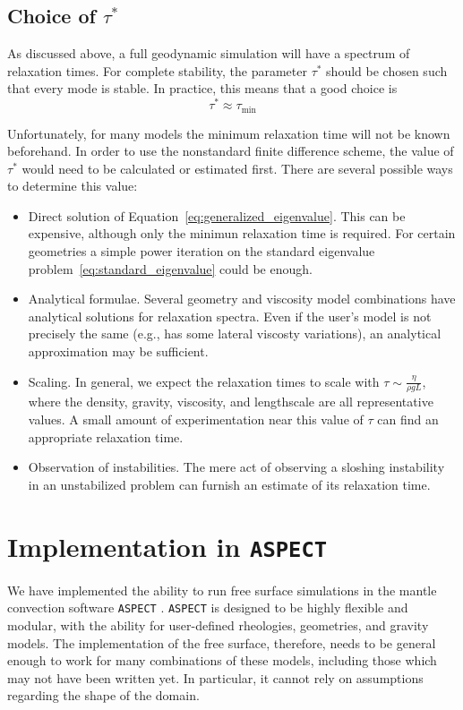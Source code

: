 \documentclass[preprint,12pt,authoryear]{elsarticle}
\begin{document}
\subsection{Choice of $\tau^*$}
As discussed above, a full geodynamic simulation will have a spectrum of relaxation times.
For complete stability, the parameter $\tau^*$ should be chosen such that every mode is stable.
In practice, this means that a good choice is 
\begin{equation}
\tau^* \approx \tau_{\mathrm{min}}
\label{eq:tau_choice}
\end{equation}

Unfortunately, for many models the minimum relaxation time will not be known beforehand. 
In order to use the nonstandard finite difference scheme, the value of $\tau^*$ would need 
to be calculated or estimated first.  There are several possible ways to determine this value:

\begin{itemize}
\item Direct solution of Equation~\eqref{eq:generalized_eigenvalue}. This can be expensive, although
only the minimun relaxation time is required. For certain geometries a simple power iteration on 
the standard eigenvalue problem~\eqref{eq:standard_eigenvalue} could be enough.
\item Analytical formulae. Several geometry and viscosity model combinations have analytical solutions
for relaxation spectra. Even if the user's model is not precisely the same (e.g., has some lateral viscosty
variations), an analytical approximation may be sufficient.
\item Scaling. In general, we expect the relaxation times to scale with $\tau \sim \frac{\eta}{\rho g L}$,
where the density, gravity, viscosity, and lengthscale are all representative values.  A small amount
of experimentation near this value of $\tau$ can find an appropriate relaxation time.
\item Observation of instabilities.  The mere act of observing a sloshing instability in an unstabilized
problem can furnish an estimate of its relaxation time.
\end{itemize} 


\section{Implementation in \texttt{ASPECT} }
\label{sec:implementation}
We have implemented the ability to run free surface simulations in the mantle convection software \texttt{ASPECT} \citep{kronbichler2012high}. 
\texttt{ASPECT} is designed to be highly flexible and modular, with the ability for user-defined rheologies, geometries, and gravity models. 
The implementation of the free surface, therefore, needs to be general enough to work for many combinations of these models, including those 
which may not have been written yet. In particular, it cannot rely on assumptions regarding the shape of the domain.
\end{document}
